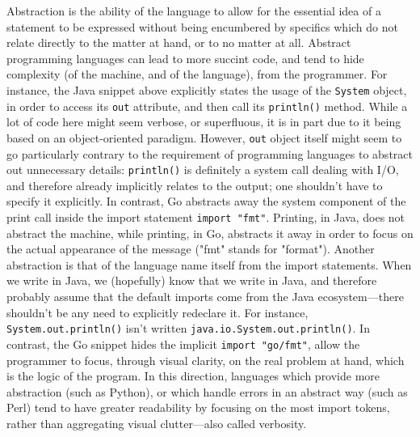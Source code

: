 Abstraction is the ability of the language to allow for the essential idea of a statement to be expressed without being encumbered by specifics which do not relate directly to the matter at hand, or to no matter at all. Abstract programming languages can lead to more succint code, and tend to hide complexity (of the machine, and of the language), from the programmer. For instance, the Java snippet above explicitly states the usage of the \lstinline{System} object, in order to access its \lstinline{out} attribute, and then call its \lstinline{println()} method. While a lot of code here might seem verbose, or superfluous, it is in part due to it being based on an object-oriented paradigm. However, \lstinline{out} object itself might seem to go particularly contrary to the requirement of programming languages to abstract out unnecessary details: \lstinline{println()} is definitely a system call dealing with I/O, and therefore already implicitly relates to the output; one shouldn't have to specify it explicitly. In contrast, Go abstracts away the system component of the print call inside the import statement \lstinline{import "fmt"}. Printing, in Java, does not abstract the machine, while printing, in Go, abstracts it away in order to focus on the actual appearance of the message ("fmt" stands for "format"). Another abstraction is that of the language name itself from the import statements. When we write in Java, we (hopefully) know that we write in Java, and therefore probably assume that the default imports come from the Java ecosystem—there shouldn't be any need to explicitly redeclare it. For instance, \lstinline{System.out.println()} isn't written \lstinline{java.io.System.out.println()}. In contrast, the Go snippet hides the implicit \lstinline{import "go/fmt"}, allow the programmer to focus, through visual clarity, on the real problem at hand, which is the logic of the program. In this direction, languages which provide more abstraction (such as Python), or which handle errors in an abstract way (such as Perl) tend to have greater readability by focusing on the most import tokens, rather than aggregating visual clutter—also called verbosity.

